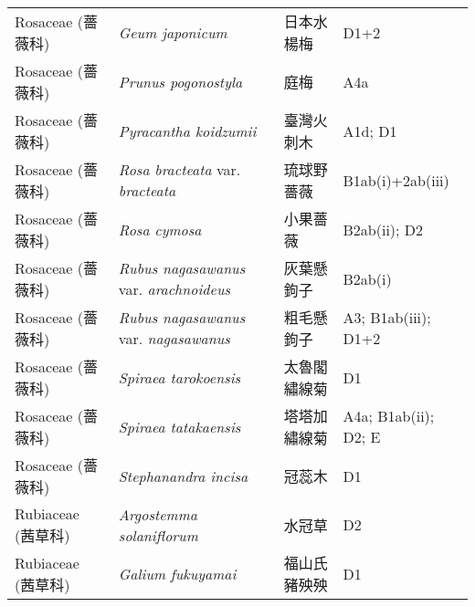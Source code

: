 \begin{longtable}{p{3cm}p{5cm}p{3cm}p{4cm}}
    Rosaceae (薔薇科) & \textit{Geum japonicum}  & 日本水楊梅 & D1+2 \index{Geum@\textit{Geum}!japonicum@\textit{japonicum}}  \index{日本水楊梅} \\
    Rosaceae (薔薇科) & \textit{Prunus pogonostyla}  & 庭梅 & A4a \index{Prunus@\textit{Prunus}!pogonostyla@\textit{pogonostyla}}  \index{庭梅} \\
    Rosaceae (薔薇科) & \textit{Pyracantha koidzumii}  & 臺灣火刺木 & A1d; D1 \index{Pyracantha@\textit{Pyracantha}!koidzumii@\textit{koidzumii}}  \index{臺灣火刺木} \\
    Rosaceae (薔薇科) & \textit{Rosa bracteata} var. \textit{bracteata}  & 琉球野薔薇 & B1ab(i)+2ab(iii) \index{Rosa@\textit{Rosa}!bracteata@\textit{bracteata}!var. bracteata@var. \textit{bracteata}}  \index{琉球野薔薇} \\
    Rosaceae (薔薇科) & \textit{Rosa cymosa}  & 小果薔薇 & B2ab(ii); D2 \index{Rosa@\textit{Rosa}!cymosa@\textit{cymosa}}  \index{小果薔薇} \\
    Rosaceae (薔薇科) & \textit{Rubus nagasawanus} var. \textit{arachnoideus}  & 灰葉懸鉤子 & B2ab(i) \index{Rubus@\textit{Rubus}!nagasawanus@\textit{nagasawanus}!var. arachnoideus@var. \textit{arachnoideus}}  \index{灰葉懸鉤子} \\
    Rosaceae (薔薇科) & \textit{Rubus nagasawanus} var. \textit{nagasawanus}  & 粗毛懸鉤子 & A3; B1ab(iii); D1+2 \index{Rubus@\textit{Rubus}!nagasawanus@\textit{nagasawanus}!var. nagasawanus@var. \textit{nagasawanus}}  \index{粗毛懸鉤子} \\
    Rosaceae (薔薇科) & \textit{Spiraea tarokoensis}  & 太魯閣繡線菊 & D1 \index{Spiraea@\textit{Spiraea}!tarokoensis@\textit{tarokoensis}}  \index{太魯閣繡線菊} \\
    Rosaceae (薔薇科) & \textit{Spiraea tatakaensis}  & 塔塔加繡線菊 & A4a; B1ab(ii); D2; E \index{Spiraea@\textit{Spiraea}!tatakaensis@\textit{tatakaensis}}  \index{塔塔加繡線菊} \\
    Rosaceae (薔薇科) & \textit{Stephanandra incisa}  & 冠蕊木 & D1 \index{Stephanandra@\textit{Stephanandra}!incisa@\textit{incisa}}  \index{冠蕊木} \\
    Rubiaceae (茜草科) & \textit{Argostemma solaniflorum}  & 水冠草 & D2 \index{Argostemma@\textit{Argostemma}!solaniflorum@\textit{solaniflorum}}  \index{水冠草} \\
    Rubiaceae (茜草科) & \textit{Galium fukuyamai}  & 福山氏豬殃殃 & D1 \index{Galium@\textit{Galium}!fukuyamai@\textit{fukuyamai}}  \index{福山氏豬殃殃} \\

\end{longtable}
